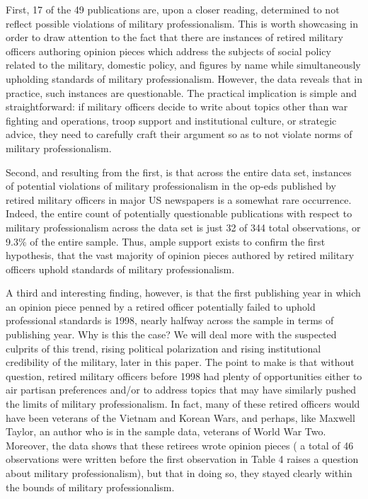 \documentclass[12pt,]{article}
\begin{document}
First, 17 of the 49 publications are, upon a closer reading, determined to not reflect possible violations of military professionalism. This is worth showcasing in order to draw attention to the fact that there are instances of retired military officers authoring opinion pieces which address the subjects of social policy related to the military, domestic policy, and figures by name while simultaneously upholding standards of military professionalism. However, the data reveals that in practice, such instances are questionable. The practical implication is simple and straightforward: if military officers decide to write about topics other than war fighting and operations, troop support and institutional culture, or strategic advice, they need to carefully craft their argument so as to not violate norms of military professionalism.

Second, and resulting from the first, is that across the entire data set, instances of potential violations of military professionalism in the op-eds published by retired military officers in major US newspapers is a somewhat rare occurrence. Indeed, the entire count of potentially questionable publications with respect to military professionalism across the data set is just 32 of 344 total observations, or 9.3\% of the entire sample. Thus, ample support exists to confirm the first hypothesis, that the vast majority of opinion pieces authored by retired military officers uphold standards of military professionalism.

A third and interesting finding, however, is that the first publishing year in which an opinion piece penned by a retired officer potentially failed to uphold professional standards is 1998, nearly halfway across the sample in terms of publishing year. Why is this the case? We will deal more with the suspected culprits of this trend, rising political polarization and rising institutional credibility of the military, later in this paper. The point to make is that without question, retired military officers before 1998 had plenty of opportunities either to air partisan preferences and/or to address topics that may have similarly pushed the limits of military professionalism. In fact, many of these retired officers would have been veterans of the Vietnam and Korean Wars, and perhaps, like Maxwell Taylor, an author who is in the sample data, veterans of World War Two. Moreover, the data shows that these retirees wrote opinion pieces ( a total of 46 observations were written before the first observation in Table 4 raises a question about military professionalism), but that in doing so, they stayed clearly within the bounds of military professionalism.
\end{document}
